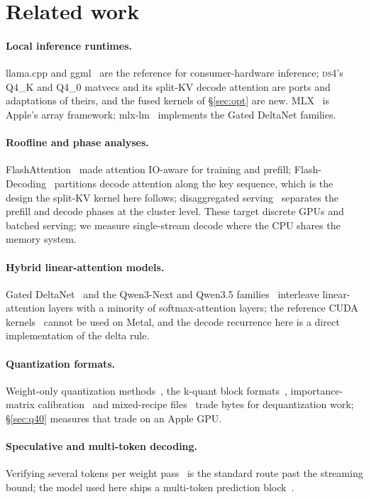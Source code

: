 \documentclass[11pt]{article}
\newcommand{\ds}{\textsc{ds4}}
\begin{document}
\section{Related work}
\paragraph{Local inference runtimes.} llama.cpp and ggml~\cite{llamacpp,ggml}
are the reference for consumer-hardware inference; \ds{}'s Q4\_K and Q4\_0
matvecs and its split-KV decode attention are ports and adaptations of theirs,
and the fused kernels of \S\ref{sec:opt} are new. MLX~\cite{mlx} is Apple's
array framework; mlx-lm~\cite{mlxlm} implements the Gated DeltaNet families.
\paragraph{Roofline and phase analyses.} FlashAttention~\cite{dao2022flashattention}
made attention IO-aware for training and prefill; Flash-Decoding~\cite{dao2023flashdecoding}
partitions decode attention along the key sequence, which is the design the
split-KV kernel here follows; disaggregated serving~\cite{patel2024splitwise,zhong2024distserve}
separates the prefill and decode phases at the cluster level. These target
discrete GPUs and batched serving; we measure single-stream decode where the
CPU shares the memory system.
\paragraph{Hybrid linear-attention models.} Gated
DeltaNet~\cite{yang2025gateddeltanet} and the Qwen3-Next and Qwen3.5
families~\cite{qwen3next,qwen35} interleave linear-attention layers with a
minority of softmax-attention layers; the reference CUDA kernels~\cite{yang2024fla}
cannot be used on Metal, and the decode recurrence here is a direct
implementation of the delta rule.
\paragraph{Quantization formats.} Weight-only quantization
methods~\cite{frantar2023gptq,lin2024awq}, the k-quant block
formats~\cite{kquants}, importance-matrix calibration~\cite{imatrix} and
mixed-recipe files~\cite{unslothdynamic} trade bytes for dequantization work;
\S\ref{sec:q40} measures that trade on an Apple GPU.
\paragraph{Speculative and multi-token decoding.} Verifying several tokens per
weight pass~\cite{leviathan2023fast,chen2023accelerating,cai2024medusa,li2024eagle}
is the standard route past the streaming bound; the model used here ships a
multi-token prediction block~\cite{gloeckle2024mtp,deepseekv3}.
\end{document}
